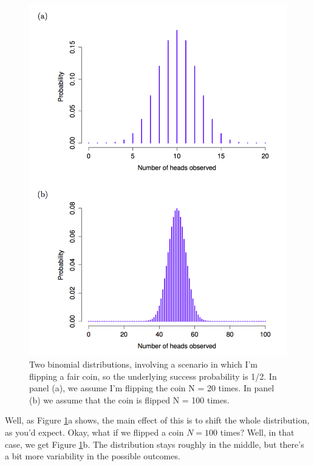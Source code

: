 \documentclass[]{book}
\begin{document}
\begin{figure}
\centering
\includegraphics{navarro_img/probability/Binomial2.png}
\caption{\label{fig:4binomial2}Two binomial distributions, involving a scenario in which I'm flipping a fair coin, so the underlying success probability is 1/2. In panel (a), we assume I'm flipping the coin N = 20 times. In panel (b) we assume that the coin is flipped N = 100 times.}
\end{figure}

Well, as Figure \ref{fig:4binomial2}a shows, the main effect of this is to shift the whole distribution, as you'd expect. Okay, what if we flipped a coin \(N=100\) times? Well, in that case, we get Figure \ref{fig:4binomial2}b. The distribution stays roughly in the middle, but there's a bit more variability in the possible outcomes.
\end{document}
